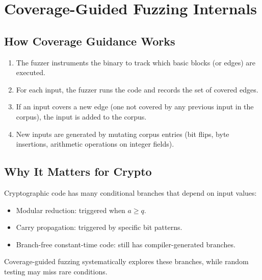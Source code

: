 \section{Coverage-Guided Fuzzing Internals}


\subsection{How Coverage Guidance Works}

\begin{enumerate}[nosep]
  \item The fuzzer instruments the binary to track which basic blocks (or edges) are
    executed.
  \item For each input, the fuzzer runs the code and records the set of covered edges.
  \item If an input covers a new edge (one not covered by any previous input in the
    corpus), the input is added to the corpus.
  \item New inputs are generated by mutating corpus entries (bit flips, byte insertions,
    arithmetic operations on integer fields).
\end{enumerate}

\subsection{Why It Matters for Crypto}

Cryptographic code has many conditional branches that depend on input values:
\begin{itemize}[nosep]
  \item Modular reduction: triggered when $a \geq q$.
  \item Carry propagation: triggered by specific bit patterns.
  \item Branch-free constant-time code: still has compiler-generated branches.
\end{itemize}

Coverage-guided fuzzing systematically explores these branches, while random testing
may miss rare conditions.

